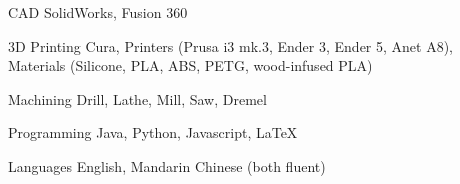 


\begin{cvskills}


\cvskill
{CAD} %
{SolidWorks, Fusion 360} %


\cvskill
{3D Printing} %
{Cura, Printers (Prusa i3 mk.3, Ender 3, Ender 5, Anet A8), Materials (Silicone, PLA, ABS, PETG, wood-infused PLA)} %

\cvskill
{Machining}
{Drill, Lathe, Mill, Saw, Dremel}

\cvskill
{Programming} %
{Java, Python, Javascript, LaTeX} %

\cvskill
{Languages}
{English, Mandarin Chinese (both fluent)}


\end{cvskills}